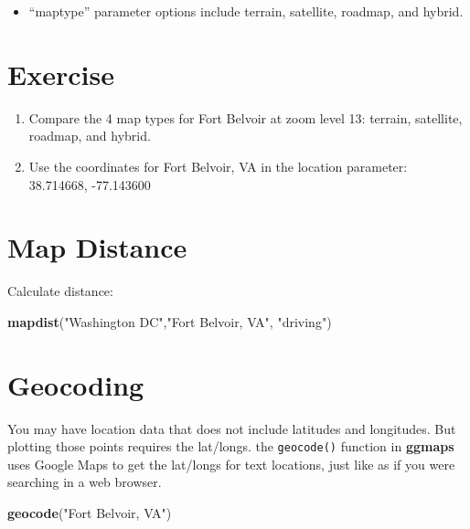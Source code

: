 \documentclass[oneside]{memoir}
\newenvironment{Shaded}{\begin{snugshade}}{\end{snugshade}}
\newcommand{\KeywordTok}[1]{\textcolor[rgb]{0.13,0.29,0.53}{\textbf{#1}}}
\newcommand{\StringTok}[1]{\textcolor[rgb]{0.31,0.60,0.02}{#1}}
\newcommand{\NormalTok}[1]{#1}
\providecommand{\tightlist}{%
  \setlength{\itemsep}{0pt}\setlength{\parskip}{0pt}}
\theoremstyle{definition}
\theoremstyle{definition}
\theoremstyle{definition}
\theoremstyle{remark}
\begin{document}
\begin{itemize}
\tightlist
\item
  ``maptype'' parameter options include terrain, satellite, roadmap, and
  hybrid.
\end{itemize}

\section{Exercise}\label{exercise}

\begin{enumerate}
\def\labelenumi{\arabic{enumi}.}
\item
  Compare the 4 map types for Fort Belvoir at zoom level 13: terrain,
  satellite, roadmap, and hybrid.
\item
  Use the coordinates for Fort Belvoir, VA in the location parameter:
  38.714668, -77.143600
\end{enumerate}

\section{Map Distance}\label{map-distance}

Calculate distance:

\begin{Shaded}
\begin{Highlighting}[]
\KeywordTok{mapdist}\NormalTok{(}\StringTok{"Washington DC"}\NormalTok{,}\StringTok{"Fort Belvoir, VA"}\NormalTok{, }\StringTok{"driving"}\NormalTok{)}
\end{Highlighting}
\end{Shaded}

\section{Geocoding}\label{geocoding}

You may have location data that does not include latitudes and
longitudes. But plotting those points requires the lat/longs. the
\texttt{geocode()} function in \textbf{ggmaps} uses Google Maps to get
the lat/longs for text locations, just like as if you were searching in
a web browser.

\begin{Shaded}
\begin{Highlighting}[]
\KeywordTok{geocode}\NormalTok{(}\StringTok{"Fort Belvoir, VA"}\NormalTok{)}
\end{Highlighting}
\end{Shaded}
\end{document}

